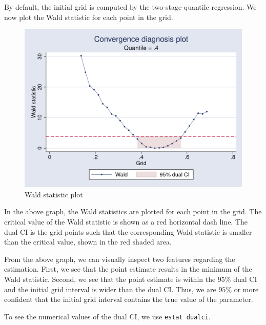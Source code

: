 \begin{stlog}

\end{stlog}

By default, the initial grid is computed by the two-stage-quantile regression.
We now plot the Wald statistic for each point in the grid. 

\begin{stlog}

\end{stlog}

\begin{figure}[H]
\caption{Wald statistic plot}
\label{fig:dualci}
\centering
\includegraphics[scale=0.3]{eps/waldplot}
\end{figure}

In the above graph, the Wald statistics are plotted for each point in the grid.
The critical value of the Wald statistic is shown as a red horizontal dash line.
The dual CI is the grid points such that the corresponding Wald statistic is
smaller than the critical value, shown in the red shaded area. 

From the above graph, we can visually inspect two features regarding the
estimation. First, we see that the point estimate results in the minimum of the
Wald statistic. Second, we see that the point estimate is within the $95\%$ dual
CI and the initial grid interval is wider than the dual CI. Thus, we are $95\%$
or more confident that the initial grid interval contains the true value of the
parameter.

To see the numerical values of the dual CI, we use {\tt estat dualci}.

\begin{stlog}

\end{stlog}

